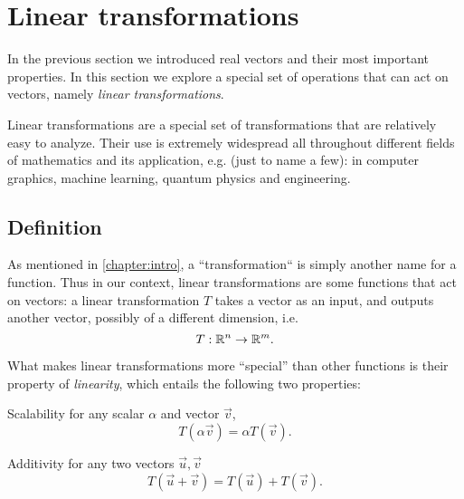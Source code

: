 \section{Linear transformations}
In the previous section we introduced real vectors and their most important properties. In this section we explore a special set of operations that can act on vectors, namely \emph{linear transformations}.

Linear transformations are a special set of transformations that are relatively easy to analyze. Their use is extremely widespread all throughout different fields of mathematics and its application, e.g. (just to name a few): in computer graphics, machine learning, quantum physics and engineering.

\subsection{Definition}
As mentioned in \autoref{chapter:intro}, a ``transformation`` is simply another name for a function. Thus in our context, linear transformations are some functions that act on vectors: a linear transformation $T$ takes a vector as an input, and outputs another vector, possibly of a different dimension, i.e.
\begin{equation}
	T:\mathbb{R}^{n}\to\mathbb{R}^{m}.
	\label{eq:linear transformation signature}
\end{equation}

What makes linear transformations more ``special'' than other functions is their property of \emph{linearity}, which entails the following two properties:
\begin{listitemize}
	\item[Scalability] for any scalar $\alpha$ and vector $\vec{v}$,
		\[
			T\left( \alpha\vec{v} \right) = \alpha T\left( \vec{v} \right).
		\]
	\item[Additivity] for any two vectors $\vec{u},\vec{v}$
		\[
			T\left( \vec{u}+\vec{v} \right) = T\left( \vec{u} \right) + T\left( \vec{v} \right).
		\]
\end{listitemize}

